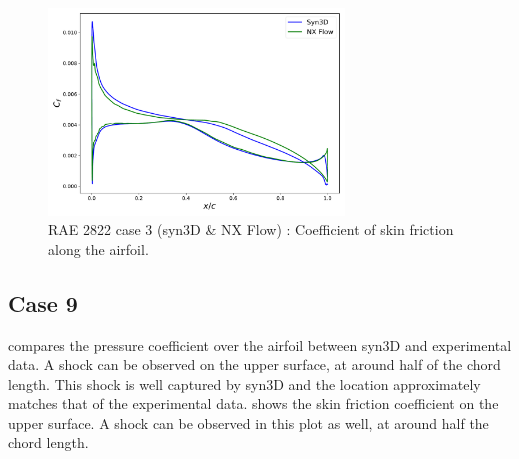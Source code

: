 \begin{figure}
    \centering
    \includegraphics[width=0.7\textwidth]{figs/rae/cf_case3}
    \caption{RAE 2822 case 3 (syn3D \& NX Flow) : Coefficient of skin friction along the airfoil.}
    \label{fig:raecf3}
\end{figure}

\subsection{Case 9}
 compares the pressure coefficient over the airfoil between syn3D and experimental data. A shock can be observed on the upper surface, at around half of the chord length. This shock is well captured by syn3D and the location approximately matches that of the experimental data.  shows the skin friction coefficient on the upper surface. A shock can be observed in this plot as well, at around half the chord length.  

